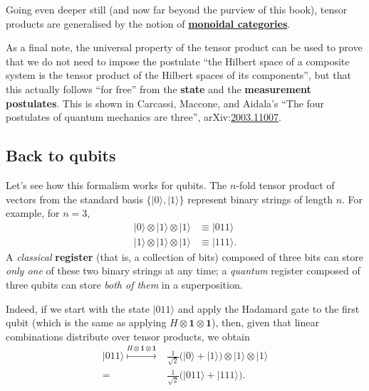 \documentclass[fleqn]{article}
\newenvironment{technical}{\noindent}{\medskip}
\begin{document}
\begin{technical}
Going even deeper still (and now far beyond the purview of this book), tensor products are generalised by the notion of \href{https://en.wikipedia.org/wiki/Monoidal_category}{\textbf{monoidal categories}}.

As a final note, the universal property of the tensor product can be used to prove that we do not need to impose the postulate ``the Hilbert space of a composite system is the tensor product of the Hilbert spaces of its components'', but that this actually follows ``for free'' from the \textbf{state} and the \textbf{measurement postulates}.
This is shown in Carcassi, Maccone, and Aidala's ``The four postulates of quantum mechanics are three'', arXiv:\href{https://arxiv.org/abs/2003.11007}{2003.11007}.

\end{technical}

\hypertarget{back-to-qubits}{%
\subsection{Back to qubits}\label{back-to-qubits}}

Let's see how this formalism works for qubits.
The \(n\)-fold tensor product of vectors from the standard basis \(\{|0\rangle,|1\rangle\}\) represent binary strings of length \(n\).
For example, for \(n=3\),
\[
  \begin{aligned}
    |0\rangle\otimes|1\rangle\otimes|1\rangle
    & \equiv |011\rangle
  \\|1\rangle\otimes|1\rangle\otimes|1\rangle
    & \equiv |111\rangle.
  \end{aligned}
\]
A \emph{classical} \textbf{register} (that is, a collection of bits) composed of three bits can store \emph{only one} of these two binary strings at any time; a \emph{quantum} register composed of three qubits can store \emph{both of them} in a superposition.

Indeed, if we start with the state \(|011\rangle\) and apply the Hadamard gate to the first qubit (which is the same as applying \(H\otimes\mathbf{1}\otimes\mathbf{1}\)), then, given that linear combinations distribute over tensor products, we obtain
\[
  \begin{aligned}
    |011\rangle
    \overset{H\otimes\mathbf{1}\otimes\mathbf{1}}{\longmapsto}
    &\frac{1}{\sqrt{2}} \big(|0\rangle + |1\rangle\big) \otimes|1\rangle\otimes|1\rangle
  \\=
    &\frac{1}{\sqrt{2}} \big(|011\rangle + |111\rangle\big).
  \end{aligned}
\]
\end{document}
